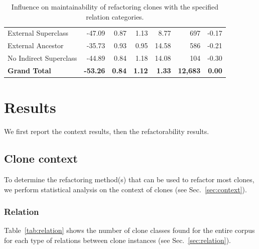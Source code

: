 \documentclass[a4paper,UKenglish,cleveref, autoref, thm-restate,authorcolumns]{lipics-v2019}
\begin{document}
\begin{table}
\begin{tabular}{@{}lrrrrrr@{}}
\hspace{10pt} External Superclass & -47.09 & 0.87 & 1.13 & 8.77 & 697 & -0.17 \\
\hspace{10pt} External Ancestor & -35.73 & 0.93 & 0.95 & 14.58 & 586 & -0.21 \\
\hspace{10pt} No Indirect Superclass & -44.89 & 0.84 & 1.18 & 14.08 & 104 & -0.30 \\ \midrule
\textbf{Grand Total} & \textbf{-53.26} & \textbf{0.84} & \textbf{1.12} & \textbf{1.33} & \textbf{12,683} & \textbf{0.00} \\ \bottomrule
\end{tabular}%
\caption{Influence on maintainability of refactoring clones with the specified relation categories.}
\label{tab:relation_refactor}
\end{table}


\section{Results} \label{sec:results}
We first report the context results, then the refactorability results.

\subsection{Clone context}
To determine the refactoring method(s) that can be used to refactor most clones, we perform statistical analysis on the context of clones (see Sec.~\ref{sec:context}).

\subsubsection{Relation}
Table~\ref{tab:relation} shows the number of clone classes found for the entire corpus for each type of relations between clone instances (see Sec.~\ref{sec:relation}).
\end{document}
